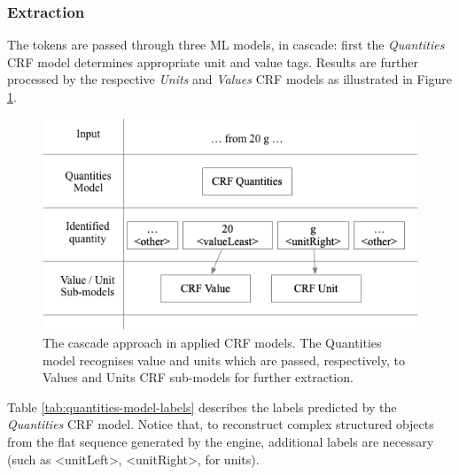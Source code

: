 \subsubsection{Extraction}
The tokens are passed through three ML models, in cascade: first the \textit{Quantities} CRF model determines appropriate unit and value tags. Results are further processed by the respective \textit{Units} and \textit{Values} CRF models as illustrated in Figure \ref{fig:schema-cascade}.  

\begin{figure}[ht]
  \centering
  \includegraphics[width=\linewidth]{figures/quantities/schema-cascade}
  \caption{The cascade approach in applied CRF models. The Quantities model recognises value and units which are passed, respectively, to Values and Units CRF sub-models for further extraction.}
  \label{fig:schema-cascade}
\end{figure}

Table \ref{tab:quantities-model-labels} describes the labels predicted by the \textit{Quantities} CRF model. Notice that, to reconstruct complex structured objects from the flat sequence generated by the engine, additional labels are necessary (such as <unitLeft>, <unitRight>, for units).

